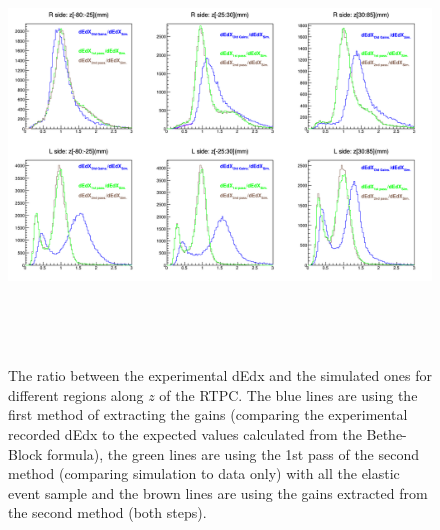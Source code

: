 \begin{figure}[!h]
\hspace{-0.5 cm}
\includegraphics[height=11.5cm]{fig/dedx_ratio_elastic_NAB.png}
\caption{The ratio between the experimental dEdx and the simulated ones for 
   different regions along $z$ of the RTPC. The blue lines are using the first 
   method of extracting the gains (comparing the experimental recorded dEdx to 
   the expected values calculated from the Bethe-Block formula), the green 
lines are using the 1st pass of the second method (comparing simulation to data 
only) with all the elastic event sample and the brown lines are using the gains 
extracted from the second method (both steps).}
\label{fig:dedxre}
\end{figure}

